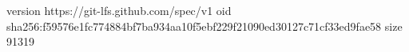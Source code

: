 version https://git-lfs.github.com/spec/v1
oid sha256:f59576e1fc774884bf7ba934aa10f5ebf229f21090ed30127c71cf33ed9fae58
size 91319
